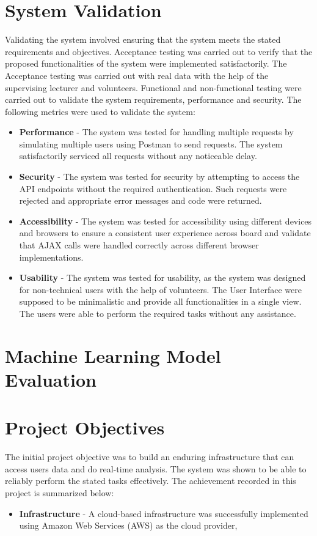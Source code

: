\section{System Validation}

Validating the system involved ensuring that the system meets the stated requirements and objectives. Acceptance testing was carried out to verify that the 
proposed functionalities of the system were implemented satisfactorily. The Acceptance testing was carried out with real data with the help of the supervising
lecturer and volunteers. Functional and non-functional testing were carried out to validate the system requirements, performance and security. 
The following metrics were used to validate the system: 
\begin{itemize}
    \item \textbf{Performance} - The system was tested for handling multiple requests by simulating multiple users using Postman to send requests. The system satisfactorily
    serviced all requests without any noticeable delay. 
    \item \textbf{Security} - The system was tested for security by attempting to access the API endpoints without the required authentication. Such requests were rejected
    and appropriate error messages and code were returned. 
    \item \textbf{Accessibility} - The system was tested for accessibility using different devices and browsers to ensure a consistent user experience across board and
    validate that AJAX calls were handled correctly across different browser implementations. 
    \item \textbf{Usability} - The system was tested for usability, as the system was designed for non-technical users with the help of volunteers. The User
    Interface were supposed to be minimalistic and provide all functionalities in a single view. The users were able to perform the required tasks without any assistance.
\end{itemize}

\section{Machine Learning Model Evaluation}

\section{Project Objectives}
The initial project objective was to build an enduring infrastructure that can access users data and do real-time analysis. The system was shown to be able to reliably 
perform the stated tasks effectively. The achievement recorded in this project is summarized below:
\begin{itemize}
\item \textbf{Infrastructure} - A cloud-based infrastructure was successfully implemented using Amazon Web Services (AWS) as the cloud provider,  
\end{itemize}

